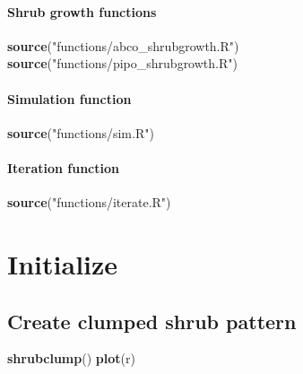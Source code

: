 \documentclass[]{article}
\newenvironment{Shaded}{\begin{snugshade}}{\end{snugshade}}
\newcommand{\KeywordTok}[1]{\textcolor[rgb]{0.13,0.29,0.53}{\textbf{#1}}}
\newcommand{\StringTok}[1]{\textcolor[rgb]{0.31,0.60,0.02}{#1}}
\newcommand{\NormalTok}[1]{#1}
\let\oldparagraph\paragraph
\renewcommand{\paragraph}[1]{\oldparagraph{#1}\mbox{}}
\begin{document}
\paragraph{Shrub growth functions}\label{shrub-growth-functions}

\begin{Shaded}
\begin{Highlighting}[]
\KeywordTok{source}\NormalTok{(}\StringTok{"functions/abco_shrubgrowth.R"}\NormalTok{)}
\KeywordTok{source}\NormalTok{(}\StringTok{"functions/pipo_shrubgrowth.R"}\NormalTok{)}
\end{Highlighting}
\end{Shaded}

\paragraph{Simulation function}\label{simulation-function}

\begin{Shaded}
\begin{Highlighting}[]
\KeywordTok{source}\NormalTok{(}\StringTok{"functions/sim.R"}\NormalTok{)}
\end{Highlighting}
\end{Shaded}

\paragraph{Iteration function}\label{iteration-function}

\begin{Shaded}
\begin{Highlighting}[]
\KeywordTok{source}\NormalTok{(}\StringTok{"functions/iterate.R"}\NormalTok{)}
\end{Highlighting}
\end{Shaded}

\section{Initialize}\label{initialize}

\subsection{Create clumped shrub
pattern}\label{create-clumped-shrub-pattern}

\begin{Shaded}
\begin{Highlighting}[]
\KeywordTok{shrubclump}\NormalTok{()}
\KeywordTok{plot}\NormalTok{(r)}
\end{Highlighting}
\end{Shaded}
\end{document}
